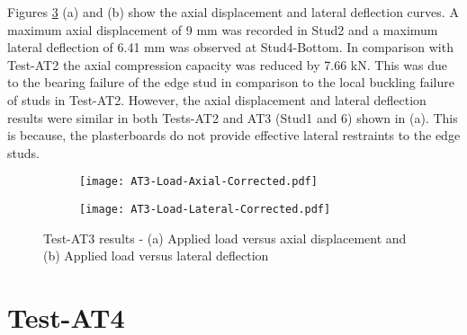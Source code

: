 Figures \ref{fig:AT3-results} (a) and (b) show the axial displacement and lateral deflection curves. A maximum axial displacement of 9 mm was recorded in Stud2 and a maximum lateral deflection of 6.41 mm was observed at Stud4-Bottom. In comparison with Test-AT2 the axial compression capacity was reduced by 7.66 kN. This was due to the bearing failure of the edge stud in comparison to the local buckling failure of studs in Test-AT2. However, the axial displacement and lateral deflection results were similar in both Tests-AT2 and AT3 (Stud1 and 6) shown in  (a). This is because, the plasterboards do not provide effective lateral restraints to the edge studs.
\begin{figure}[!htbp]
	\centering
	\begin{subfigure}[b]{0.6\textwidth}
		\centering
		\texttt{[image: AT3-Load-Axial-Corrected.pdf]}
		\caption{}
		\label{subfig:AT3-Load-Axial-Corrected}
	\end{subfigure}
	\begin{subfigure}[b]{0.6\textwidth}
		\centering
		\texttt{[image: AT3-Load-Lateral-Corrected.pdf]}
		\caption{}
		\label{subfig:AT3-Load-Lateral-Corrected}
	\end{subfigure}
	   \caption{Test-AT3 results - (a) Applied load versus axial displacement and (b) Applied load versus lateral deflection}
	   \label{fig:AT3-results}
\end{figure}

\section{Test-AT4}

